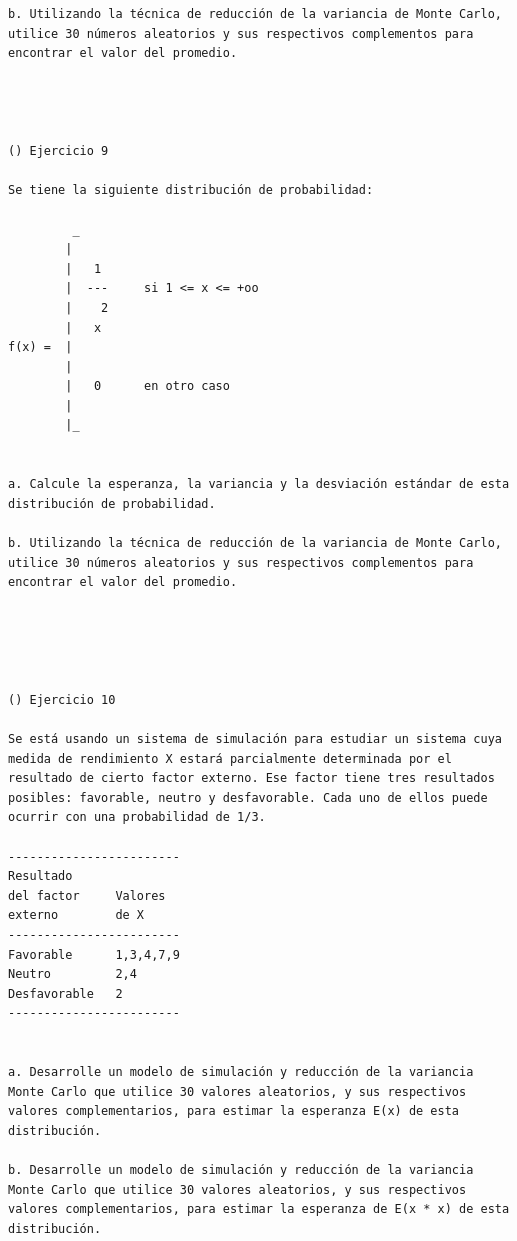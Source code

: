 \begin{verbatim}
b. Utilizando la técnica de reducción de la variancia de Monte Carlo, utilice 30 números aleatorios y sus respectivos complementos para encontrar el valor del promedio.




() Ejercicio 9

Se tiene la siguiente distribución de probabilidad:

         _
        |
        |   1
        |  ---     si 1 <= x <= +oo
        |    2
        |   x
f(x) =  |
        |
        |   0      en otro caso
        |
        |_


a. Calcule la esperanza, la variancia y la desviación estándar de esta distribución de probabilidad.

b. Utilizando la técnica de reducción de la variancia de Monte Carlo, utilice 30 números aleatorios y sus respectivos complementos para encontrar el valor del promedio.





() Ejercicio 10

Se está usando un sistema de simulación para estudiar un sistema cuya medida de rendimiento X estará parcialmente determinada por el resultado de cierto factor externo. Ese factor tiene tres resultados posibles: favorable, neutro y desfavorable. Cada uno de ellos puede ocurrir con una probabilidad de 1/3. 

------------------------
Resultado
del factor     Valores
externo        de X
------------------------
Favorable      1,3,4,7,9
Neutro         2,4
Desfavorable   2
------------------------


a. Desarrolle un modelo de simulación y reducción de la variancia Monte Carlo que utilice 30 valores aleatorios, y sus respectivos valores complementarios, para estimar la esperanza E(x) de esta distribución. 

b. Desarrolle un modelo de simulación y reducción de la variancia Monte Carlo que utilice 30 valores aleatorios, y sus respectivos valores complementarios, para estimar la esperanza de E(x * x) de esta distribución.



\end{verbatim}